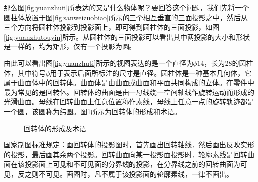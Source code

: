 那么图\ref{fig:yuanzhuti}所表达的又是什么物体呢？要回答这个问题，我们先将一个圆柱体放置于图\ref{fig:sanweizuobiao}所示的三个相互垂直的三面投影之中，然后从三个方向将圆柱体投影到投影面上，即可得到圆柱体的三面投影，如图\ref{fig:yuanzhutouyin}所示。从圆柱体的三面投影可以看出其中两投影的大小和形状是一样的，均为矩形，仅有一个投影为圆。
\begin{figure}[htbp]
\centering
{}\hspace{30pt}
\end{figure}

由此可以看出图\ref{fig:yuanzhuti}所示的视图表达的是一个直径为$\phi 14$，长为28的圆柱体，其中符号$\phi$用于表示后面所标注的尺寸是直径。圆柱体是一种基本几何体，它属于曲面体中的回转体。曲面体是由曲面或曲面和平面共同构成的立体。在零件中最为常见的是回转体。回转体的曲面是由一母线绕一空间轴线作旋转运动而形成的光滑曲面。母线在回转曲面上任意位置称作素线，母线上任意一点的旋转轨迹都是一个圆，该圆称为纬圆。图\ref{fig:huizhuangti}所示为回转体的形成和术语。
\begin{figure}[htbp]
\centering
{}\hspace{30pt}
\caption{回转体的形成及术语}\label{fig:huizhuangti}
\end{figure}

国家制图标准规定：画回转体的投影图时，首先画出回转轴线，然后画出反映实形的投影，最后画其余两个投影。回转曲面向某一投影面投影时，轮廓素线是回转曲面在该投影面上可见和不可见面的分界线的投影，在分界线之前的回转曲面为可见，反之则不可见。画图时，凡不属于该投影面的轮廓素线，一律不画出。

\endinput